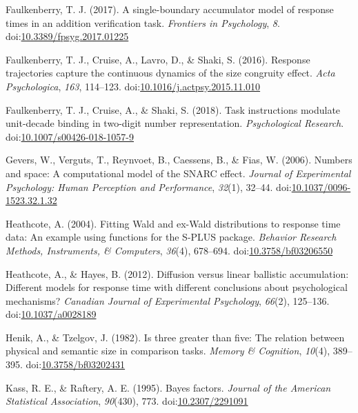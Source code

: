\documentclass[english,,man]{apa6}
\theoremstyle{definition}
\theoremstyle{definition}
\theoremstyle{definition}
\theoremstyle{remark}
\begin{document}
\leavevmode\hypertarget{ref-faulkenberry2017}{}%
Faulkenberry, T. J. (2017). A single-boundary accumulator model of
response times in an addition verification task. \emph{Frontiers in
Psychology}, \emph{8}.
doi:\href{https://doi.org/10.3389/fpsyg.2017.01225}{10.3389/fpsyg.2017.01225}

\leavevmode\hypertarget{ref-faulkenberryShaki2016}{}%
Faulkenberry, T. J., Cruise, A., Lavro, D., \& Shaki, S. (2016).
Response trajectories capture the continuous dynamics of the size
congruity effect. \emph{Acta Psychologica}, \emph{163}, 114--123.
doi:\href{https://doi.org/10.1016/j.actpsy.2015.11.010}{10.1016/j.actpsy.2015.11.010}

\leavevmode\hypertarget{ref-faulkenberry2018}{}%
Faulkenberry, T. J., Cruise, A., \& Shaki, S. (2018). Task instructions
modulate unit-decade binding in two-digit number representation.
\emph{Psychological Research}.
doi:\href{https://doi.org/10.1007/s00426-018-1057-9}{10.1007/s00426-018-1057-9}

\leavevmode\hypertarget{ref-gevers2006}{}%
Gevers, W., Verguts, T., Reynvoet, B., Caessens, B., \& Fias, W. (2006).
Numbers and space: A computational model of the SNARC effect.
\emph{Journal of Experimental Psychology: Human Perception and
Performance}, \emph{32}(1), 32--44.
doi:\href{https://doi.org/10.1037/0096-1523.32.1.32}{10.1037/0096-1523.32.1.32}

\leavevmode\hypertarget{ref-heathcote2004}{}%
Heathcote, A. (2004). Fitting Wald and ex-Wald distributions to response
time data: An example using functions for the S-PLUS package.
\emph{Behavior Research Methods, Instruments, \& Computers},
\emph{36}(4), 678--694.
doi:\href{https://doi.org/10.3758/bf03206550}{10.3758/bf03206550}

\leavevmode\hypertarget{ref-heathcote2012}{}%
Heathcote, A., \& Hayes, B. (2012). Diffusion versus linear ballistic
accumulation: Different models for response time with different
conclusions about psychological mechanisms? \emph{Canadian Journal of
Experimental Psychology}, \emph{66}(2), 125--136.
doi:\href{https://doi.org/10.1037/a0028189}{10.1037/a0028189}

\leavevmode\hypertarget{ref-henik1982}{}%
Henik, A., \& Tzelgov, J. (1982). Is three greater than five: The
relation between physical and semantic size in comparison tasks.
\emph{Memory \& Cognition}, \emph{10}(4), 389--395.
doi:\href{https://doi.org/10.3758/bf03202431}{10.3758/bf03202431}

\leavevmode\hypertarget{ref-kass1995}{}%
Kass, R. E., \& Raftery, A. E. (1995). Bayes factors. \emph{Journal of
the American Statistical Association}, \emph{90}(430), 773.
doi:\href{https://doi.org/10.2307/2291091}{10.2307/2291091}
\end{document}
